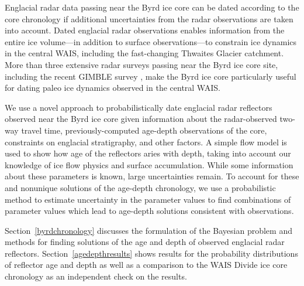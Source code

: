 Englacial radar data passing near the Byrd ice core can be dated according to the core chronology if additional uncertainties from the radar observations are taken into account. Dated englacial radar observations enables information from the entire ice volume---in addition to surface observations---to constrain ice dynamics in the central WAIS, including the fast-changing Thwaites Glacier catchment. More than three extensive radar surveys passing near the Byrd ice core site, including the recent GIMBLE survey \citep{duncan}, make the Byrd ice core particularly useful for dating paleo ice dynamics observed in the central WAIS.

We use a novel approach to probabilistically date englacial radar reflectors observed near the Byrd ice core given information about the radar-observed two-way travel time, previously-computed age-depth observations of the core, constraints on englacial stratigraphy, and other factors. A simple flow model is used to show how age of the reflectors aries with depth, taking into account our knowledge of ice flow physics and surface accumulation. While some information about these parameters is known, large uncertainties remain. To account for these and nonunique solutions of the age-depth chronology, we use a probabilistic method to estimate uncertainty in the parameter values to find combinations of parameter values which lead to age-depth solutions consistent with observations.





Section~\ref{byrdchronology} discusses the formulation of the Bayesian problem and methods for finding solutions of the age and depth of observed englacial radar reflectors. Section~\ref{agedepthresults} shows results for the probability distributions of reflector age and depth as well as a comparison to the WAIS Divide ice core chronology as an independent check on the results. %
